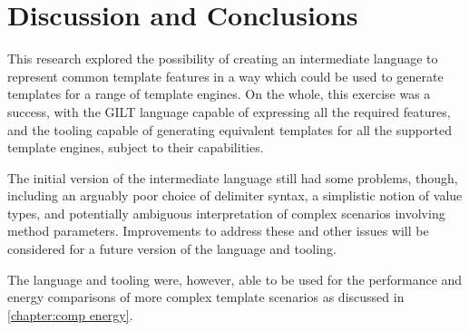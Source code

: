 \section*{Discussion and Conclusions}

This research explored the possibility of creating an intermediate language to represent common template features in a way which could be used to generate templates for a range of template engines. On the whole, this exercise was a success, with the GILT language capable of expressing all the required features, and the tooling capable of generating equivalent templates for all the supported template engines, subject to their capabilities.

The initial version of the intermediate language still had some problems, though, including an arguably poor choice of delimiter syntax, a simplistic notion of value types, and potentially ambiguous interpretation of complex scenarios involving method parameters. Improvements to address these and other issues will be considered for a future version of the language and tooling.

The language and tooling were, however, able to be used for the performance and energy comparisons of more complex template scenarios as discussed in \autoref{chapter:comp energy}.

